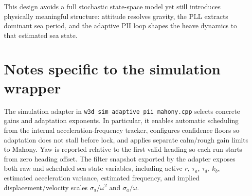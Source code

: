 \documentclass[conference]{IEEEtran}
\begin{document}
This design avoids a full stochastic state-space model yet still introduces physically meaningful structure: attitude resolves gravity, the PLL extracts dominant sea period, and the adaptive PII loop shapes the heave dynamics to that estimated sea state.

\section{Notes specific to the simulation wrapper}
The simulation adapter in \texttt{w3d\_sim\_adaptive\_pii\_mahony.cpp} selects concrete gains and adaptation exponents. In particular, it enables automatic scheduling from the internal acceleration-frequency tracker, configures confidence floors so adaptation does not stall before lock, and applies separate calm/rough gain limits to Mahony. Yaw is reported relative to the first valid heading so each run starts from zero heading offset. The filter snapshot exported by the adapter exposes both raw and scheduled sea-state variables, including active $r$, $\tau_a$, $\tau_d$, $k_b$, estimated acceleration variance, estimated frequency, and implied displacement/velocity scales $\sigma_a/\omega^2$ and $\sigma_a/\omega$.
\end{document}
